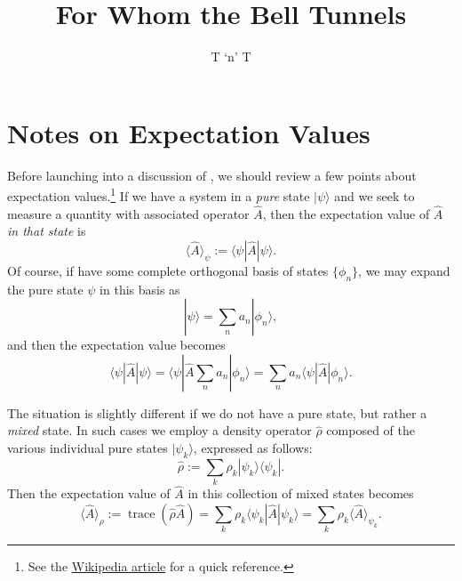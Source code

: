 \documentclass[12pt]{article}
\title{For Whom the Bell Tunnels}
\author{T `n' T}
\begin{document}
\maketitle
\listoftodos

\section{Notes on Expectation Values}

Before launching into a discussion of \cite{Bell1966}, we should review a few points about expectation values.\footnote{See the \href{http://en.wikipedia.org/wiki/Expectation_value_\%28quantum_mechanics\%29}{Wikipedia article} for a quick reference.}  If we have a system in a \emph{pure} state $|\psi\rangle$ and we seek to measure a quantity with associated operator $\hat{A}$, then the expectation value of $\hat{A}$ \emph{in that state} is
\begin{displaymath}
  \langle \hat{A} \rangle_{\psi} := \langle \psi | \hat{A} | \psi \rangle.
\end{displaymath}
Of course, if have some complete orthogonal basis of states $\{ \phi_n \}$, we may expand the pure state $\psi$ in this basis as
\begin{displaymath}
  |\psi\rangle = \sum_{n} a_n |\phi_n \rangle,
\end{displaymath}
and then the expectation value becomes
\begin{displaymath}
  \langle \psi | \hat{A} | \psi \rangle
  = \langle \psi | \hat{A} \sum_{n} a_n | \phi_n \rangle
  = \sum_{n} a_n \langle \psi | \hat{A} | \phi_n \rangle.
\end{displaymath}

The situation is slightly different if we do not have a pure state, but rather a \emph{mixed} state.  In such cases we employ a density operator $\hat{\rho}$ composed of the various individual pure states $| \psi_k \rangle$, expressed as follows:
\begin{displaymath}
  \hat{\rho} := \sum_k \rho_k | \psi_k \rangle \langle \psi_k |.
\end{displaymath}
Then the expectation value of $\hat{A}$ in this collection of mixed states becomes
\begin{displaymath}
  \langle \hat{A} \rangle_{\rho} := \operatorname{trace} (\hat{\rho} \hat{A})
  = \sum_k \rho_k \langle \psi_k | \hat{A} | \psi_k \rangle
  = \sum_k \rho_k \langle \hat{A} \rangle_{\psi_k}.
\end{displaymath}
\end{document}
